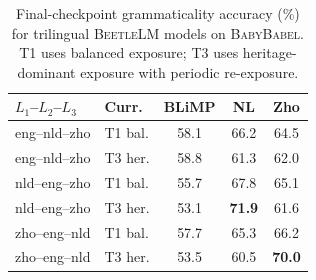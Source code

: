 


\begin{table}[t]
\centering
\small
\setlength{\tabcolsep}{3pt}
\renewcommand{\arraystretch}{1.1}
\begin{tabular}{llccc}
\toprule
\textbf{$L_1$--$L_2$--$L_3$} & \textbf{Curr.} & \textbf{BLiMP} & \textbf{NL} & \textbf{Zho} \\
\midrule
eng--nld--zho & T1 bal.   & 58.1 & 66.2 & 64.5 \\
eng--nld--zho & T3 her.   & 58.8 & 61.3 & 62.0 \\
\midrule
nld--eng--zho & T1 bal.   & 55.7 & 67.8 & 65.1 \\
nld--eng--zho & T3 her.   & 53.1 & \textbf{71.9} & 61.6 \\
\midrule
zho--eng--nld & T1 bal.   & 57.7 & 65.3 & 66.2 \\
zho--eng--nld & T3 her.   & 53.5 & 60.5 & \textbf{70.0} \\
\bottomrule
\end{tabular}
\caption{\small Final-checkpoint grammaticality accuracy (\%) for trilingual \textsc{BeetleLM} models on \textsc{BabyBabel}. T1 uses balanced exposure; T3 uses heritage-dominant exposure with periodic re-exposure.}
\label{tab:trilingual_minimal}
\end{table}



